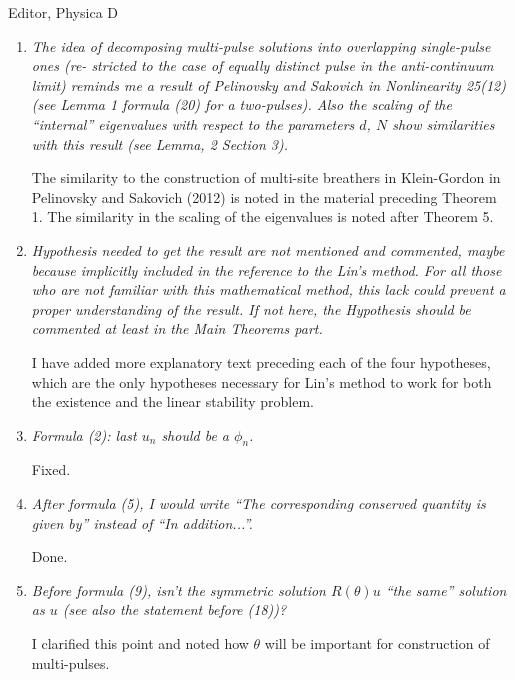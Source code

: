 \documentclass[11pt]{letter}
\begin{document}
\begin{letter}{Editor, Physica D}
\begin{enumerate}
\item \emph{The idea of decomposing multi-pulse solutions into overlapping single-pulse ones (re- stricted to the case of equally distinct pulse in the anti-continuum limit) reminds me a result of Pelinovsky and Sakovich in Nonlinearity 25(12) (see Lemma 1 formula (20) for a two-pulses). Also the scaling of the ``internal'' eigenvalues with respect to the parameters $d$, $N$ show similarities with this result (see Lemma, 2 Section 3).}

\vspace{4mm}
The similarity to the construction of multi-site breathers in Klein-Gordon in Pelinovsky and Sakovich (2012) is noted in the material preceding Theorem 1. The similarity in the scaling of the eigenvalues is noted after Theorem 5.
\vspace{4mm}

\item \emph{Hypothesis needed to get the result are not mentioned and commented, maybe because implicitly included in the reference to the Lin’s method. For all those who are not familiar with this mathematical method, this lack could prevent a proper understanding of the result. If not here, the Hypothesis should be commented at least in the Main Theorems part.}

\vspace{4mm}
I have added more explanatory text preceding each of the four hypotheses, which are the only hypotheses necessary for Lin's method to work for both the existence and the linear stability problem.
\vspace{4mm}

\item \emph{Formula (2): last $u_n$ should be a $\phi_n$.}

\vspace{4mm}
Fixed.
\vspace{4mm}

\item \emph{After formula (5), I would write ``The corresponding conserved quantity is given by''
instead of ``In addition...''.}

\vspace{4mm}
Done.
\vspace{4mm}

\item \emph{Before formula (9), isn’t the symmetric solution $R(\theta)u$ ``the same'' solution as $u$ (see also the statement before (18))?}

\vspace{4mm}
I clarified this point and noted how $\theta$ will be important for construction of multi-pulses.
\vspace{4mm}


\end{enumerate}
\end{letter}
\end{document}
